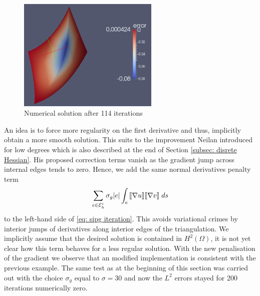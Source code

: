 \begin{figure}[h]
	\centering
	\includegraphics[width=0.6\textwidth]{plots/sharp_edges.png}
	\caption{Numerical solution after 114 iterations}
	\label{fig: sharp edges}
\end{figure}

An idea is to force more regularity on the first derivative and thus, implicitly obtain a more smooth solution. This suits to the improvement Neilan introduced for low degrees \cite[Section 5]{Neilan2014} which is also described at the end of Section \ref{subsec: disrete Hessian}. His proposed correction terms vanish as the gradient jump across internal edges tends to zero.
Hence, we add the same normal derivatives penalty term 
\begin{align}
	\sum_{e \in \mathcal{E}_h^i} \sigma_g |e |\int_{e} {{\llbracket  \nabla u \rrbracket \llbracket \nabla v \rrbracket}\;ds} \label{eq: grad penalty term}
\end{align}
to the left-hand side of \eqref{eq: sipg iteration}.
This avoids variational crimes by interior jumps of derivatives along interior edges of the triangulation. We implicitly assume that the desired solution is contained in $H^2(\Omega)$, it is not yet clear how this term behaves for a less regular solution.
With the new penalisation of the gradient we observe that an modified implementation is consistent with the previous example. The same test as at the beginning of this section was carried out with the choice $\sigma_g$ equal to $\sigma=30$ and now the $L^2$ errors stayed for 200 iterations numerically zero.

